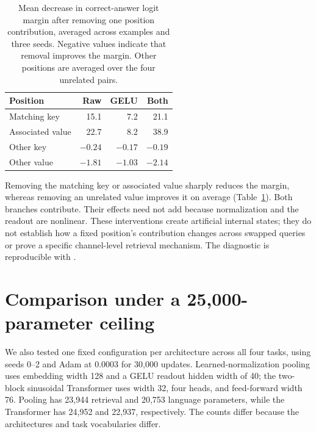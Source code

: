 \documentclass[11pt]{article}
\begin{document}
\begin{table}[htbp]
\centering\small
\caption{Mean decrease in correct-answer logit margin after removing one position contribution, averaged across examples and three seeds. Negative values indicate that removal improves the margin. Other positions are averaged over the four unrelated pairs.}
\label{tab:contribution-ablation}
\begin{tabular}{lrrr}
\toprule
Position & Raw & GELU & Both\\
\midrule
Matching key & 15.1 & 7.2 & 21.1\\
Associated value & 22.7 & 8.2 & 38.9\\
Other key & $-0.24$ & $-0.17$ & $-0.19$\\
Other value & $-1.81$ & $-1.03$ & $-2.14$\\
\bottomrule
\end{tabular}
\end{table}

Removing the matching key or associated value sharply reduces the margin, whereas removing an unrelated value improves it on average (Table~\ref{tab:contribution-ablation}). Both branches contribute. Their effects need not add because normalization and the readout are nonlinear. These interventions create artificial internal states; they do not establish how a fixed position's contribution changes across swapped queries or prove a specific channel-level retrieval mechanism. The diagnostic is reproducible with .

\section{Comparison under a 25,000-parameter ceiling}
We also tested one fixed configuration per architecture across all four tasks,
using seeds 0--2 and Adam at 0.0003 for 30,000 updates. Learned-normalization
pooling uses embedding width 128 and a GELU readout hidden width of 40;
the two-block sinusoidal Transformer uses width 32, four heads, and
feed-forward width 76. Pooling has 23,944 retrieval and 20,753 language
parameters, while the Transformer has 24,952 and 22,937, respectively.
The counts differ because the architectures and task vocabularies differ.
\end{document}
